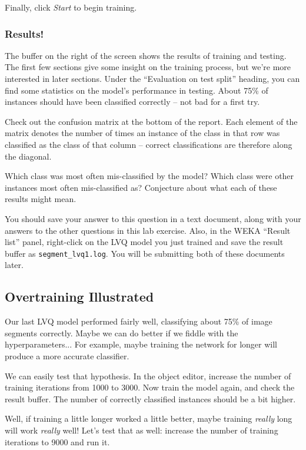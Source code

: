 \documentclass[11pt]{cselabheader}
\begin{document}
Finally, click \textit{Start} to begin training.

\subsubsection{Results!}

The buffer on the right of the screen shows the results of training and testing. The first few sections give some insight on the training process, but we're more interested in later sections. Under the ``Evaluation on test split'' heading, you can find some statistics on the model's performance in testing. About 75\% of instances should have been classified correctly -- not bad for a first try.

Check out the confusion matrix at the bottom of the report. Each element of the matrix denotes the number of times an instance of the class in that row was classified as the class of that column -- correct classifications are therefore along the diagonal.

\begin{ex}
  Which class was most often mis-classified by the model? Which class were other instances most often mis-classified as? Conjecture about what each of these results might mean.

  You should save your answer to this question in a text document, along with your answers to the other questions in this lab exercise. Also, in the WEKA ``Result list'' panel, right-click on the LVQ model you just trained and save the result buffer as \texttt{segment\_lvq1.log}. You will be submitting both of these documents later.
\end{ex}

\pagebreak
\subsection{Overtraining Illustrated}

Our last LVQ model performed fairly well, classifying about 75\% of image segments correctly. Maybe we can do better if we fiddle with the hyperparameters... For example, maybe training the network for longer will produce a more accurate classifier.

We can easily test that hypothesis. In the object editor, increase the number of training iterations from 1000 to 3000. Now train the model again, and check the result buffer. The number of correctly classified instances should be a bit higher.

Well, if training a little longer worked a little better, maybe training \textit{really} long will work \textit{really} well! Let's test that as well: increase the number of training iterations to 9000 and run it.
\end{document}
